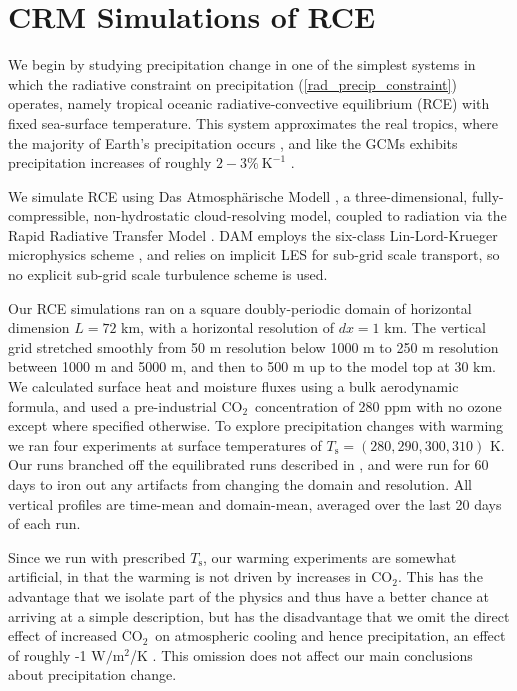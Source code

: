 \documentclass[10pt]{article}
\newcommand{\eqnref}[1]{(\ref{#1})}
\newcommand{\cotwo}{\ensuremath{\mathrm{CO_2}}}
\newcommand{\Wmsq}{\ensuremath{\mathrm{W/m^2}}}
\newcommand{\Ts}{\ensuremath{T_\mathrm{s}}}
\newcommand{\Kinverse}{\ensuremath{\mathrm{K^{-1}}}}
\begin{document}
\section{CRM Simulations of RCE}
We begin by studying precipitation change in one of the simplest systems in which the radiative constraint on precipitation \eqnref{rad_precip_constraint} operates, namely tropical oceanic radiative-convective equilibrium (RCE) with fixed sea-surface temperature. This system approximates the real tropics, where the majority of Earth's precipitation occurs \citep{simpson1988}, and like the GCMs exhibits precipitation increases of roughly $2 -3\%\ \Kinverse$ \citep{romps2011, muller2011b}.  

We simulate RCE using Das Atmosph\"arische Modell \citep[DAM,][]{romps2008},   a three-dimensional, fully-compressible, non-hydrostatic cloud-resolving model, coupled to radiation via the Rapid Radiative Transfer Model 
\citep[RRTM,][]{mlawer1997}. DAM employs the six-class Lin-Lord-Krueger  microphysics scheme \citep{lin1983, lord1984, krueger1995}, and relies on implicit LES \citep{margolin2006} for sub-grid scale transport, so no explicit sub-grid scale turbulence scheme is used.
	
	Our RCE simulations ran on a square doubly-periodic domain of horizontal dimension $L=72$ km, with  a horizontal resolution of $dx=1$ km. The vertical grid stretched smoothly from 50 m resolution below 1000 m to 250 m resolution between 1000 m and 5000 m, and then to 500 m up to the model top at  30 km. We calculated surface heat and moisture fluxes using a bulk aerodynamic formula, and used a pre-industrial \cotwo\  concentration of 280 ppm with no ozone except where specified otherwise. To explore precipitation changes  with warming we ran four experiments at surface temperatures of $\Ts=(280,290,300,310)$ K. Our runs branched off the equilibrated runs described in \cite{romps2014}, and were run for 60 days  to iron out any artifacts from changing the domain and resolution. All vertical profiles are time-mean and domain-mean, averaged over the last 20 days of each run. 

Since we run with prescribed \Ts, our warming experiments are somewhat artificial, in that the warming is not driven by increases in \cotwo. This has the advantage that we isolate part of the physics and thus have a better chance at arriving at a simple description, but has the disadvantage that we omit the direct effect of increased \cotwo\ on atmospheric cooling and hence precipitation, an effect of roughly -1 \Wmsq/K \citep{pendergrass2014}. This omission does not affect our main conclusions about precipitation change.
\end{document}
